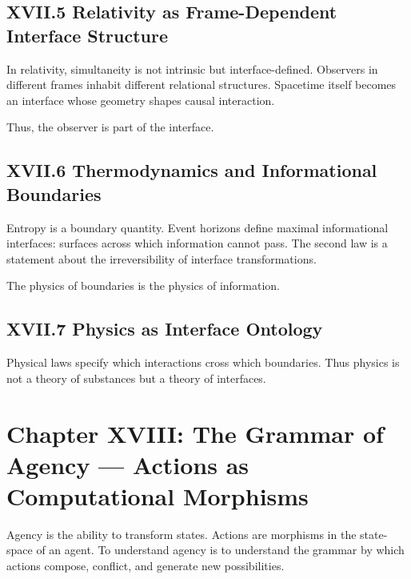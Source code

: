 \documentclass[11pt,letterpaper]{article}
\begin{document}
\subsection{XVII.5 Relativity as Frame-Dependent Interface Structure}

In relativity, simultaneity is not intrinsic but interface-defined. Observers in different frames inhabit different relational structures. Spacetime itself becomes an interface whose geometry shapes causal interaction.

Thus, the observer is part of the interface.

\subsection{XVII.6 Thermodynamics and Informational Boundaries}

Entropy is a boundary quantity. Event horizons define maximal informational interfaces: surfaces across which information cannot pass. The second law is a statement about the irreversibility of interface transformations.

The physics of boundaries is the physics of information.

\subsection{XVII.7 Physics as Interface Ontology}

Physical laws specify which interactions cross which boundaries. Thus physics is not a theory of substances but a theory of interfaces.

\newpage

\section{Chapter XVIII: The Grammar of Agency — Actions as Computational Morphisms}

Agency is the ability to transform states. Actions are morphisms in the state-space of an agent. To understand agency is to understand the grammar by which actions compose, conflict, and generate new possibilities.
\end{document}
